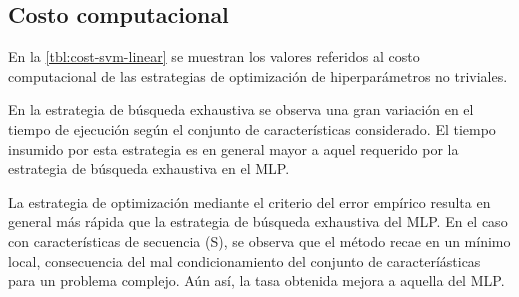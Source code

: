 \subsection{Costo computacional}
En la \autoref{tbl:cost-svm-linear} se muestran los valores referidos
al costo computacional de las estrategias de optimización de
hiperparámetros no triviales.

En la estrategia de búsqueda exhaustiva
se observa una gran variación en el tiempo de ejecución según el
conjunto de características considerado. El tiempo insumido por esta
estrategia es en general mayor a aquel requerido por la estrategia de
búsqueda exhaustiva en el MLP.

La estrategia de optimización mediante el criterio del error empírico
resulta en general más rápida que la estrategia de búsqueda exhaustiva
del MLP. En el caso \micropred{} con características de secuencia
(S), se observa que el método recae en un mínimo local, consecuencia
del mal condicionamiento del conjunto de caracteríásticas para un
problema complejo. Aún así, la tasa obtenida mejora a aquella del MLP.